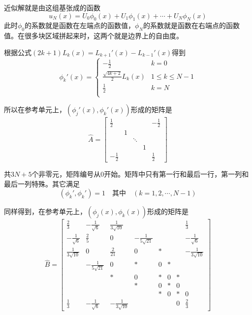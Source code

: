 \documentclass[UTF8,12pt]{article}
\begin{document}
近似解就是由这组基张成的函数
$$ u_N(x) = U_0 \phi_0(x) + U_1 \phi_1(x) + \cdots + U_N \phi_N(x) $$
此时$\phi_0$的系数就是函数在左端点的函数值，$\phi_N$的系数就是函数在右端点的函数值。在很多块区域拼起来时，这两个就是边界上的自由度。

根据公式$(2k+1) L_k(x) = L_{k+1}'(x) - L_{k-1}'(x)$得到
\begin{equation}
\phi_k'(x) = \left\{ \begin{array}{ll}
-\frac{1}{2} & k = 0 \\
\frac{\sqrt{4k+2}}{2} L_{k}(x) & 1 \leq k \leq N-1 \\
\frac{1}{2} & k = N \\
\end{array} \right.
\end{equation}

所以在参考单元上，$(\phi_j'(x), \phi_k'(x))$形成的矩阵是
\begin{equation}
\hat{A} = \left[ \begin{matrix}
\frac12 &  &  &  & -\frac12 \\ 
& 1 &  &  &  \\ 
&  & \ddots &  &  \\ 
&  &  & 1 &  \\ 
-\frac12 &  &  &  & \frac12
\end{matrix}  \right]
\end{equation}

共$3N+5$个非零元，矩阵编号从0开始。矩阵中只有第一行和最后一行，第一列和最后一列特殊。其它满足
$$ (\phi_k', \phi_k') = 1 \quad \text{其中} \quad (k = 1, 2, \cdots, N-1) $$

同样得到，在参考单元上，$(\phi_j(x), \phi_k(x))$形成的矩阵是
\begin{equation}
\hat{B} = \left[ \begin{array}{cccccccc}
\frac23 & -\frac{1}{\sqrt{6}} & \frac{1}{3\sqrt{10}} &  &  &  &  & \frac13 \\ 
-\frac{1}{\sqrt{6}} & \frac25 & 0 & -\frac{1}{5\sqrt{21}} &  &  &  & -\frac{1}{\sqrt{6}} \\ 
\frac{1}{3\sqrt{10}} & 0 & \frac{2}{21} & 0 & * &  &  & -\frac{1}{3\sqrt{10}} \\ 
& -\frac{1}{5\sqrt{21}} & 0 & * & 0 & * &  &  \\ 
&  & * & 0 & * & 0 & * &  \\ 
&  &  & * & 0 & * & 0 &  \\ 
&  &  &  & * & 0 & * & 0 \\ 
\frac13 & -\frac{1}{\sqrt{6}} & -\frac{1}{3\sqrt{10}} &  &  &  & 0 & \frac23
\end{array}  \right]
\end{equation}
\end{document}
